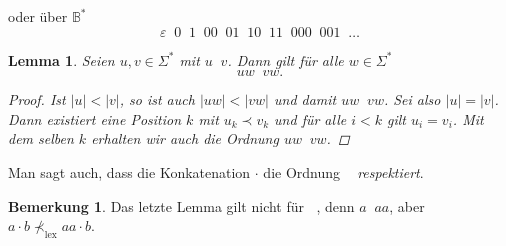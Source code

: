 \documentclass[11pt, a4paper]{article}
\theoremstyle{definition}
\newtheorem*{remark*}{Bemerkung}
\theoremstyle{plain}
\newtheorem{lemma}[definition]{Lemma}
\numberwithin{equation}{section}
\DeclareMathOperator{\lex}{\prec_\text{lex}}
\DeclareMathOperator{\canon}{\prec_\text{cn}}
\begin{document}
oder über $\mathbb{B}^\ast$
$$
	\varepsilon \canon 0 \canon 1 \canon 00 \canon 01 \canon 10 \canon 11 \canon 000 \canon 001 \canon \ldots
$$
\begin{lemma}\label{lem:cn}
	Seien $u, v \in \Sigma^\ast$ mit $u \canon v$. Dann gilt für alle $w \in \Sigma^\ast$
	$$
		uw \canon vw.
	$$
	\begin{proof}
		Ist $|u| < |v|$, so ist auch $|uw| < |vw|$ und damit $uw \canon vw$. Sei also $|u| = |v|$. Dann existiert eine Position $k$ mit $u_k \prec v_k$ und für alle $i < k$ gilt $u_i = v_i$. Mit dem selben $k$ erhalten wir auch die Ordnung $uw \canon vw$.
	\end{proof}
\end{lemma}
Man sagt auch, dass die Konkatenation $\cdot$ die Ordnung $\canon$ \textit{respektiert}.
\begin{remark*}
	Das letzte Lemma gilt nicht für $\lex$, denn $a \lex aa$, aber $a \cdot b \not\prec_\text{lex} aa \cdot b$.
\end{remark*}
\end{document}
